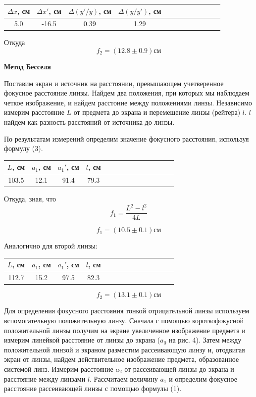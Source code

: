 \documentclass[14pt]{article}
\begin{document}
\begin{center}
\begin{tabular}{|c|c|c|c|c|c|c|c|c|c|c|c|}
\hline
$\Delta x$, см	&	$\Delta x'$, см	&	$\Delta(y'/y)$, см	&	$\Delta(y/y')$, см	\\
\hline
5.0				&	-16.5			&	0.39				&	1.29				\\
\hline
\end{tabular}
\end{center}

Откуда
$$
	f_2 = (12.8 \pm 0.9)\text{см}
$$

\textbf{Метод Бесселя}

Поставим экран и источник на расстоянии, превышающем учетверенное фокусное расстояние линзы. Найдем два положения, при которых мы наблюдаем четкое изображение, и найдем расстоние между положениями линзы. Независимо измерим расстояние $L$ от предмета до экрана
и перемещение линзы (рейтера) $l$. $l$ найдем как разность расстояний от источника до линзы.

По результатам измерений определим значение фокусного расстояния,
используя формулу (3).

\begin{center}
\begin{tabular}{|c|c|c|c|c|c|c|c|c|c|c|c|c|c|}
\hline
$L$, см		&	$a_1$, см	&	$a_1'$, см	&	$l$, см		\\
\hline
103.5		&	12.1		&	91.4		&	79.3		\\
\hline
\end{tabular}
\end{center}

Откуда, зная, что
$$
	f_1 = \frac{L^2 - l^2}{4L}
$$

$$
	f_1 = (10.5 \pm 0.1)\text{см}
$$

Аналогично для второй линзы:
\begin{center}
\begin{tabular}{|c|c|c|c|c|c|c|c|c|c|c|c|c|c|}
\hline
$L$, см		&	$a_1$, см	&	$a_1'$, см	&	$l$, см		\\
\hline
112.7		&	15.2		&	97.5		&	82.3		\\
\hline
\end{tabular}
\end{center}

$$
	f_2 = (13.1 \pm 0.1)\text{см}
$$

Для определения фокусного расстояния тонкой отрицательной линзы используем
вспомогательную положительную линзу. Сначала с помощью
короткофокусной положительной линзы получим на экране увеличенное
изображение предмета
и измерим линейкой расстояние от линзы до
экрана ($a_0$ на рис. 4). Затем между положительной линзой
и экраном
разместим рассеивающую линзу и, отодвигая экран от линзы, найдем
действительное изображение предмета, образованное системой линз. Измерим
расстояние
$a_2$ от рассеивающей линзы до экрана
и расстояние
между линзами $l$.
Рассчитаем величину $a_1$ и определим фокусное расстояние рассеивающей
линзы с помощью формулы (1).
\end{document}
